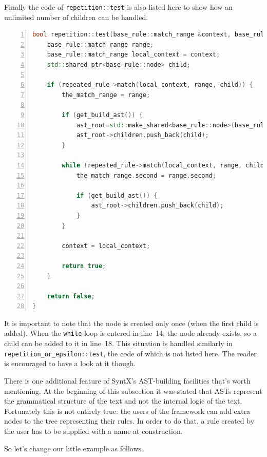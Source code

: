 \documentclass[12pt]{article}
\begin{document}
Finally the code of \texttt{repetition::test} is also listed here to show how an unlimited number of children
can be handled.

\begin{center}
	\begin{minipage}[ht]{0.95\textwidth}
		\begin{lstlisting}[language=C++, breaklines=true, numbers=left]
bool repetition::test(base_rule::match_range &context, base_rule::match_range &the_match_range, std::shared_ptr<base_rule::node> &ast_root) {
	base_rule::match_range range;
	base_rule::match_range local_context = context;
	std::shared_ptr<base_rule::node> child;

	if (repeated_rule->match(local_context, range, child)) {
		the_match_range = range;

		if (get_build_ast()) {
			ast_root=std::make_shared<base_rule::node>(base_rule::node::type::repetition);
			ast_root->children.push_back(child);
		}

		while (repeated_rule->match(local_context, range, child)) {
			the_match_range.second = range.second;

			if (get_build_ast()) {
				ast_root->children.push_back(child);
			}
		}

		context = local_context;

		return true;
	}

	return false;
}
		\end{lstlisting}
	\end{minipage}
\end{center}

It is important to note that the node is created only once (when the first child is added). When the
\texttt{while} loop is entered in line~14, the node already exists, so a child can be added to it in line~18.
This situation is handled similarly in \texttt{repetition\_or\_epsilon::test}, the code of which is not listed
here. The reader is encouraged to have a look at it though.

There is one additional feature of SyntX's AST-building facilities that's worth mentioning. At the beginning
of this subsection it was stated that ASTs represent the grammatical structure of the text and not the
internal logic of the text. Fortunately this is not entirely true: the users of the framework can add extra
nodes to the tree representing their rules. In order to do that, a rule created by the user has to be supplied
with a name at construction.

So let's change our little example as follows.
\end{document}
